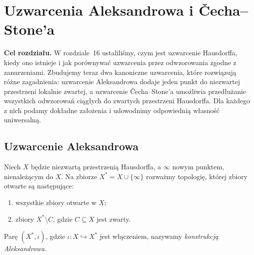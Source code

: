 \chapter{Uzwarcenia Aleksandrowa i Čecha--Stone'a}
\label{ch:topog-uzwarcenia-kanoniczne}

\noindent\textbf{Cel rozdziału.}
W rozdziale~16 ustaliliśmy, czym jest uzwarcenie
Hausdorffa, kiedy ono istnieje i jak porównywać
uzwarcenia przez odwzorowania zgodne z zanurzeniami.
Zbudujemy teraz dwa kanoniczne uzwarcenia,
które rozwiązują różne zagadnienia:
uzwarcenie Aleksandrowa dodaje jeden punkt
do niezwartej przestrzeni lokalnie zwartej,
a uzwarcenie Čecha--Stone'a umożliwia
przedłużanie wszystkich odwzorowań
ciągłych do zwartych przestrzeni Hausdorffa.
Dla każdego z nich podamy dokładne założenia
i udowodnimy odpowiednią własność uniwersalną.

\section{Uzwarcenie Aleksandrowa}
\label{sec:topog-uzwarcenia-aleksandrow}

\begin{definicja}
\label{def:topog-uzwarcenia-aleksandrow}
Niech $X$ będzie niezwartą przestrzenią
Hausdorffa, a $\infty$ nowym punktem,
nienależącym do $X$. Na zbiorze
$X^\ast=X\cup\{\infty\}$ rozważmy topologię,
której zbiory otwarte są następujące:
\begin{enumerate}[label=(\roman*)]
\item wszystkie zbiory otwarte w $X$;
\item zbiory $X^\ast\setminus C$,
      gdzie $C\subseteq X$ jest zwarty.
\end{enumerate}
Parę $(X^\ast,\iota)$, gdzie
$\iota\colon X\hookrightarrow X^\ast$
jest włączeniem, nazywamy
\emph{konstrukcją Aleksandrowa}.
\end{definicja}

